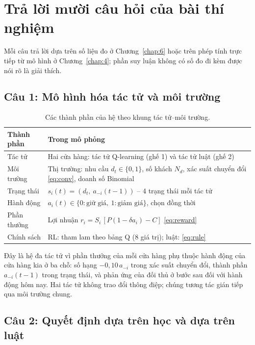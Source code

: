 \chapter{Trả lời mười câu hỏi của bài thí nghiệm}\label{chap:7}

Mỗi câu trả lời dựa trên số liệu đo ở Chương~\ref{chap:6} hoặc trên phép tính trực tiếp từ mô hình ở Chương~\ref{chap:4}; phần suy luận không có số đo đi kèm được nói rõ là giải thích.

\section{Câu 1: Mô hình hóa tác tử và môi trường}

\begin{table}[!htbp]\centering\caption{Các thành phần của hệ theo khung tác tử--môi trường.}\label{tab:ch7-q1}
{\small\begin{tabular}{L{3.2cm}L{11cm}}
\toprule
Thành phần & Trong mô phỏng \\
\midrule
Tác tử & Hai cửa hàng: tác tử Q-learning (ghế 1) và tác tử luật (ghế 2) \\
Môi trường & Thị trường: nhu cầu $d_t\in\{0,1\}$, số khách $N_d$, xác suất chuyển đổi \eqref{eq:conv}, doanh số Binomial \\
Trạng thái & $s_i(t)=(d_t,\ a_{-i}(t-1))$ -- 4 trạng thái mỗi tác tử \\
Hành động & $a_i(t)\in\{0:\text{giữ giá},\ 1:\text{giảm giá}\}$, chọn đồng thời \\
Phần thưởng & Lợi nhuận $r_i=S_i\,[P(1-\delta a_i)-C]$ \eqref{eq:reward} \\
Chính sách & RL: tham lam theo bảng Q (8 giá trị); luật: \eqref{eq:rule} \\
\bottomrule
\end{tabular}}
\end{table}

Đây là hệ đa tác tử vì phần thưởng của mỗi cửa hàng phụ thuộc hành động của cửa hàng kia ở ba chỗ: số hạng $-0{,}10\,a_{-i}$ trong xác suất chuyển đổi, thành phần $a_{-i}(t-1)$ trong trạng thái, và phản ứng của đối thủ ở bước sau đối với hành động hôm nay. Hai tác tử không trao đổi thông điệp; chúng tương tác gián tiếp qua môi trường chung.

\section{Câu 2: Quyết định dựa trên học và dựa trên luật}

